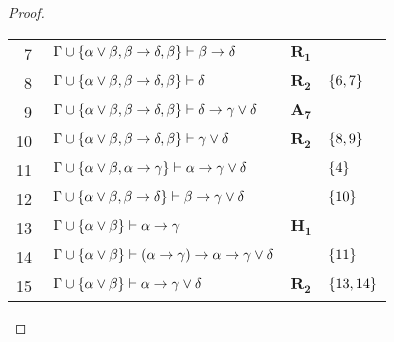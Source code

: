 \begin{tcolorbox}[enhanced jigsaw, breakable, sharp corners, colframe=black, colback=white, boxrule=0.5pt, left=1.5mm, right=1.5mm, top=1.5mm, bottom=1.5mm]
\begin{lemma}
\begin{proof}
\begin{xltabular}{\textwidth}{r | X l l}
            \scriptsize{\phantom{0}7}\phantom{ } & $\ \Gamma\cup\set{\alpha\vee\beta,\beta\to\delta,\beta}\vdash\beta\to\delta$                                                            & $\hyperref[modal.rule.1]{\mathbf{R_1}}$            & \\[\rowskip]
            \scriptsize{\phantom{0}8}\phantom{ } & $\ \Gamma\cup\set{\alpha\vee\beta,\beta\to\delta,\beta}\vdash\delta$                                                                    & $\hyperref[modal.rule.2]{\mathbf{R_2}}$            & $\left\{6,7\right\}$\\[\rowskip]
            \scriptsize{\phantom{0}9}\phantom{ } & $\ \Gamma\cup\set{\alpha\vee\beta,\beta\to\delta,\beta}\vdash\delta\to\gamma\vee\delta$                                                 & $\hyperref[modal.axiom.6]{\mathbf{A_7}}$           & \\[\rowskip]
            \scriptsize{10}\phantom{ }           & $\ \Gamma\cup\set{\alpha\vee\beta,\beta\to\delta,\beta}\vdash\gamma\vee\delta$                                                          & $\hyperref[modal.rule.2]{\mathbf{R_2}}$            & $\left\{8,9\right\}$\\[\rowskip]
            \scriptsize{11}\phantom{ }           & $\ \Gamma\cup\set{\alpha\vee\beta,\alpha\to\gamma}\vdash\alpha\to\gamma\vee\delta$                                                      &                                & $\left\{4\right\}$\\[\rowskip]
            \scriptsize{12}\phantom{ }           & $\ \Gamma\cup\set{\alpha\vee\beta,\beta\to\delta}\vdash\beta\to\gamma\vee\delta$                                                        &                                & $\left\{10\right\}$\\[\rowskip]
            \scriptsize{13}\phantom{ }           & $\ \Gamma\cup\set{\alpha\vee\beta}\vdash\alpha\to\gamma$                                                                                & $\mathbf{H_1}$                                     & \\[\rowskip]
            \scriptsize{14}\phantom{ }           & $\ \Gamma\cup\set{\alpha\vee\beta}\vdash(\alpha\to\gamma)\to\alpha\to\gamma\vee\delta$                                                  &                                & $\left\{11\right\}$\\[\rowskip]
            \scriptsize{15}\phantom{ }           & $\ \Gamma\cup\set{\alpha\vee\beta}\vdash\alpha\to\gamma\vee\delta$                                                                      & $\hyperref[modal.rule.2]{\mathbf{R_2}}$            & $\left\{13,14\right\}$\\[\rowskip]

\end{xltabular}
\end{proof}
\end{lemma}
\end{tcolorbox}
